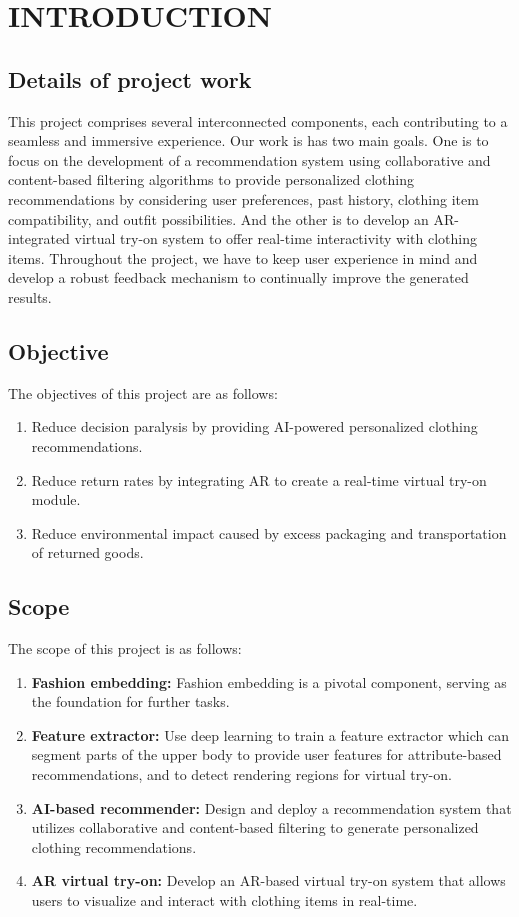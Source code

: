 \chapter{INTRODUCTION}

\section{Details of project work}
	This project comprises several interconnected components, each contributing to a seamless and immersive experience. Our work is has two main goals. One is to focus on the development of a recommendation system using collaborative and content-based filtering algorithms to provide personalized clothing recommendations by considering user preferences, past history, clothing item compatibility, and outfit possibilities. And the other is to develop an AR-integrated virtual try-on system to offer real-time interactivity with clothing items. Throughout the project, we have to keep user experience in mind and develop a robust feedback mechanism to continually improve the generated results.

\section{Objective}
	The objectives of this project are as follows:

	\begin{enumerate}
		\item Reduce decision paralysis by providing AI-powered personalized clothing recommendations.
		\item Reduce return rates by integrating AR to create a real-time virtual try-on module.
		\item Reduce environmental impact caused by excess packaging and transportation of returned goods.
	\end{enumerate}

\section{Scope}
	The scope of this project is as follows:

	\begin{enumerate}
		\item \textbf{Fashion embedding:} Fashion embedding is a pivotal component, serving as the foundation for further tasks.
		\item \textbf{Feature extractor:} Use deep learning to train a feature extractor which can segment parts of the upper body to provide user features for attribute-based recommendations, and to detect rendering regions for virtual try-on.
		\item \textbf{AI-based recommender:} Design and deploy a recommendation system that utilizes collaborative and content-based filtering to generate personalized clothing recommendations.
		\item \textbf{AR virtual try-on:} Develop an AR-based virtual try-on system that allows users to visualize and interact with clothing items in real-time.
	\end{enumerate}


